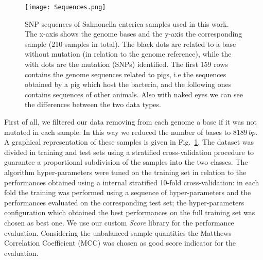 \documentclass{standalone}
\begin{document}
\begin{figure}[htbp]
\centering
% 
\texttt{[image: Sequences.png]}
\caption{SNP sequences of Salmonella enterica samples used in this work.
The x-axis shows the genome bases and the y-axis the corresponding sample (210 samples in total).
The black dots are related to a base without mutation (in relation to the genome reference), while the with dots are the mutation (SNPs) identified.
The first 159 rows contains the genome sequences related to pigs, i.e the sequences obtained by a pig which host the bacteria, and the following ones contains sequences of other animals.
Also with naked eyes we can see the differences between the two data types.
}
\label{fig:SNPsAle}
\end{figure}

First of all, we filtered our data removing from each genome a base if it was not mutated in each sample.
In this way we reduced the number of bases to $8189\,bp$.
A graphical representation of these samples is given in Fig.~\ref{fig:SNPsAle}.
The dataset was divided in training and test sets using a stratified cross-validation procedure to guarantee a proportional subdivision of the samples into the two classes.
The algorithm hyper-parameters were tuned on the training set in relation to the performances obtained using a internal stratified 10-fold cross-validation: in each fold the training was performed using a sequence of hyper-parameters and the performances evaluated on the corresponding test set; the hyper-parameters configuration which obtained the best performances on the full training set was chosen as best one.
We use our custom \emph{Score} library for the performance evaluation.
Considering the unbalanced sample quantities the Matthews Correlation Coefficient (MCC) was chosen as good score indicator for the evaluation.
\end{document}
